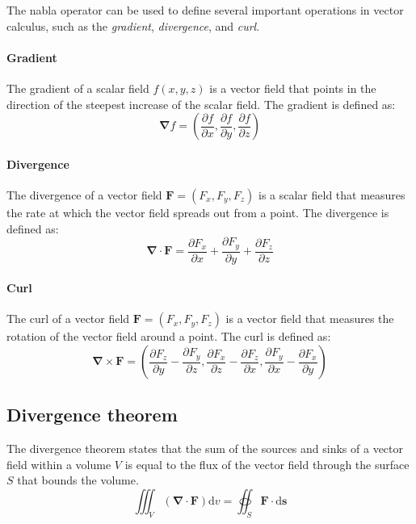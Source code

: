 The nabla operator can be used to define several important operations in vector calculus, such as the \emph{gradient}, \emph{divergence}, and \emph{curl}.

\paragraph{Gradient}
The gradient of a scalar field $f(x,y,z)$ is a vector field that points in the direction of the steepest increase of the scalar field. The gradient is defined as:
\begin{equation}
  \pmb{\nabla} f = \left( \frac{\partial f}{\partial x}, \frac{\partial f}{\partial y}, \frac{\partial f}{\partial z} \right)
\end{equation}

\paragraph{Divergence}
The divergence of a vector field $\mathbf{F} = (F_x, F_y, F_z)$ is a scalar field that measures the rate at which the vector field spreads out from a point. The divergence is defined as:
\begin{equation}
  \pmb{\nabla} \cdot \mathbf{F} = \frac{\partial F_x}{\partial x} + \frac{\partial F_y}{\partial y} + \frac{\partial F_z}{\partial z}
\end{equation}

\paragraph{Curl}
The curl of a vector field $\mathbf{F} = (F_x, F_y, F_z)$ is a vector field that measures the rotation of the vector field around a point. The curl is defined as:
\begin{equation}
  \pmb{\nabla} \times \mathbf{F} = \left( \frac{\partial F_z}{\partial y} - \frac{\partial F_y}{\partial z}, \frac{\partial F_x}{\partial z} - \frac{\partial F_z}{\partial x}, \frac{\partial F_y}{\partial x} - \frac{\partial F_x}{\partial y} \right)
\end{equation}



\subsection{Divergence theorem}\label{sec:divergence-theorem}
The divergence theorem states that the sum of the sources and sinks of a vector field within a volume $V$ is equal to the flux of the vector field through the surface $S$ that bounds the volume. 
\begin{equation}
  \iiint_V \left( \pmb{\nabla} \cdot \mathbf{F} \right) \text{d}v = \oiint_S \mathbf{F} \cdot \text{d}\mathbf{s}
\end{equation}

